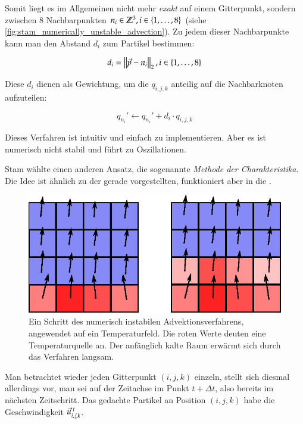Somit liegt es im Allgemeinen nicht mehr \emph{exakt} auf einem
Gitterpunkt, sondern zwischen 8 Nachbarpunkten $n_i \in
\PimiddyGanz^3, i \in \{1,\ldots,8\}$ (siehe
\cref{fig:stam_numerically_unstable_advection}). Zu jedem dieser
Nachbarpunkte kann man den Abstand $d_i$ zum Partikel bestimmen:

\begin{equation}
d_i = \PimiddyNorm{2}{\vec{p} - n_i}, i \in \{1,\ldots,8\}
\end{equation}

Diese $d_i$ dienen als Gewichtung, um die  $q_{i,j,k}$
anteilig auf die Nachbarknoten aufzuteilen:

\begin{equation}
q_{n_i}' \leftarrow q_{n_i}' + d_i \cdot q_{i,j,k}
\end{equation}

Dieses Verfahren ist intuitiv und einfach zu implementieren. Aber es ist
numerisch nicht stabil und führt zu Oszillationen.

Stam wählte einen anderen Ansatz, die sogenannte \emph{Methode der
Charakteristika}. Die Idee ist ähnlich zu der gerade vorgestellten, funktioniert
aber in die .

\begin{figure}[ht]
\centering
\includegraphics[width=12cm]{images/advection_bad_example}
\caption{Ein Schritt des numerisch instabilen Advektionsverfahrens, angewendet auf ein Temperaturfeld. Die roten Werte deuten eine Temperaturquelle an. Der anfänglich kalte Raum erwärmt sich durch das Verfahren langsam.}
\end{figure}

Man betrachtet wieder jeden Gitterpunkt $(i,j,k)$ einzeln, stellt sich
diesmal allerdings vor, man sei auf der Zeitachse im Punkt $t+\Delta
t$, also bereits im nächsten Zeitschritt. Das gedachte Partikel an
Position $(i,j,k)$ habe die Geschwindigkeit
$\vec{u}_{i,j,k}^{\PimiddyFormelText{ }t}$.

